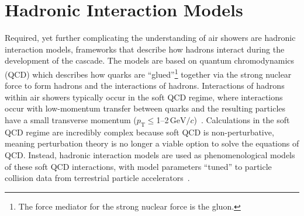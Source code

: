 





\section{Hadronic Interaction Models}\label{sec:models}
Required, yet further complicating the understanding of air showers are hadronic interaction models, frameworks that describe how hadrons interact during the development of the cascade.
The models are based on quantum chromodynamics (QCD) which describes how quarks are ``glued''\footnote[9]{The force mediator for the strong nuclear force is the gluon.} together via the strong nuclear force to form hadrons and the interactions of hadrons.
Interactions of hadrons within air showers typically occur in the soft QCD regime, where interactions occur with low-momentum transfer between quarks and the resulting particles have a small transverse momentum ($p_{\text{T}}\leq$\numrange{1}{2}$\,\text{GeV}/c$)~\cite{christiansen_annurev2025_softqcd}.
Calculations in the soft QCD regime are incredibly complex because soft QCD is non-perturbative, meaning perturbation theory is no longer a viable option to solve the equations of QCD.
Instead, hadronic interaction models are used as phenomenological models of these soft QCD interactions, with model parameters ``tuned'' to particle collision data from terrestrial particle accelerators~\cite{albrecht_revphys2025_tuning}.

